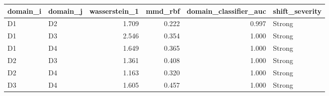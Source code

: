 \begin{tabular}{llrrrl}
\toprule
domain_i & domain_j & wasserstein_1 & mmd_rbf & domain_classifier_auc & shift_severity \\
\midrule
D1 & D2 & 1.709 & 0.222 & 0.997 & Strong \\
D1 & D3 & 2.546 & 0.354 & 1.000 & Strong \\
D1 & D4 & 1.649 & 0.365 & 1.000 & Strong \\
D2 & D3 & 1.361 & 0.408 & 1.000 & Strong \\
D2 & D4 & 1.163 & 0.320 & 1.000 & Strong \\
D3 & D4 & 1.605 & 0.457 & 1.000 & Strong \\
\bottomrule
\end{tabular}

